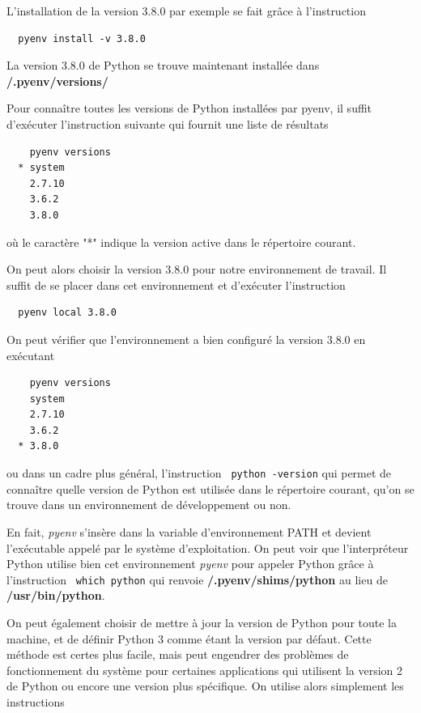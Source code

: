 \documentclass[twoside,a4paper,11pt,frenchb,openany]{report}
\begin{document}
L'installation de la version 3.8.0 par exemple se fait grâce à l'instruction
\begin{verbatim}  pyenv install -v 3.8.0\end{verbatim}

La version 3.8.0 de Python se trouve maintenant installée dans \textbf{\raisebox{-1ex}{\textasciitilde}/.pyenv/versions/}

Pour connaître toutes les versions de Python installées par pyenv, il suffit d'exécuter l'instruction suivante qui fournit une liste de résultats
\begin{verbatim}    pyenv versions
  * system
    2.7.10
    3.6.2
    3.8.0\end{verbatim}
où le caractère "*" indique la version active dans le répertoire courant.

On peut alors choisir la version 3.8.0 pour notre environnement de travail. Il suffit de se placer dans cet environnement et d'exécuter l'instruction
\begin{verbatim}  pyenv local 3.8.0\end{verbatim}

On peut vérifier que l'environnement a bien configuré la version 3.8.0 en exécutant

\begin{verbatim}    pyenv versions
    system
    2.7.10
    3.6.2
  * 3.8.0\end{verbatim}

ou dans un cadre plus général, l'instruction
\texttt{  python \textemdash-version} qui
permet de connaître quelle version de Python est utilisée dans le répertoire courant, qu'on se trouve dans un environnement de développement ou non.

En fait, \textit{pyenv} s'insère dans la variable d'environnement PATH et devient l'exécutable appelé par le système d'exploitation. On peut voir que l'interpréteur Python utilise bien cet environnement \textit{pyenv} pour appeler Python grâce à l'instruction
\texttt{   which python}
qui renvoie \textbf{\raisebox{-1ex}{\textasciitilde}/.pyenv/shims/python} au lieu de \textbf{/usr/bin/python}.

On peut également choisir de mettre à jour la version de Python pour toute la machine, et de définir Python 3 comme étant la version par défaut. Cette méthode est certes plus facile, mais peut engendrer des problèmes de fonctionnement du système pour certaines applications qui utilisent la version 2 de Python ou encore une version plus spécifique. On utilise alors simplement les instructions
\end{document}
